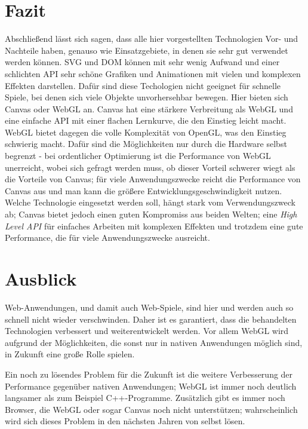 \documentclass[a4paper, 12pt]{article}
\begin{document}
\section{Fazit}
Abschließend lässt sich sagen, dass alle hier vorgestellten Technologien Vor- und Nachteile haben, genauso wie Einsatzgebiete, in denen sie sehr gut verwendet werden können. SVG und DOM können mit sehr wenig Aufwand und einer schlichten API sehr schöne Grafiken und Animationen mit vielen und komplexen Effekten darstellen. Dafür sind diese Techologien nicht geeignet für schnelle Spiele, bei denen sich viele Objekte unvorhersehbar bewegen. Hier bieten sich Canvas oder WebGL an. Canvas hat eine stärkere Verbreitung als WebGL und eine einfache API mit einer flachen Lernkurve, die den Einstieg leicht macht. WebGL bietet dagegen die volle Komplexität von OpenGL, was den Einstieg schwierig macht. Dafür sind die Möglichkeiten nur durch die Hardware selbst begrenzt - bei ordentlicher Optimierung ist die Performance von WebGL unerreicht, wobei sich gefragt werden muss, ob dieser Vorteil schwerer wiegt als die Vorteile von Canvas; für viele Anwendungszwecke reicht die Performance von Canvas aus und man kann die größere Entwicklungsgeschwindigkeit nutzen. Welche Technologie eingesetzt werden soll, hängt stark vom Verwendungszweck ab; Canvas bietet jedoch einen guten Kompromiss aus beiden Welten; eine \emph{High Level API} für einfaches Arbeiten mit komplexen Effekten und trotzdem eine gute Performance, die für viele Anwendungszwecke ausreicht.
\section{Ausblick}
Web-Anwendungen, und damit auch Web-Spiele, sind hier und werden auch so schnell nicht wieder verschwinden. Daher ist es garantiert, dass die behandelten Technologien verbessert und weiterentwickelt werden. Vor allem WebGL wird aufgrund der Möglichkeiten, die sonst nur in nativen Anwendungen möglich sind, in Zukunft eine große Rolle spielen.

Ein noch zu lösendes Problem für die Zukunft ist die weitere Verbesserung der Performance gegenüber nativen Anwendungen; WebGL ist immer noch deutlich langsamer als zum Beispiel C++-Programme. Zusätzlich gibt es immer noch Browser, die WebGL oder sogar Canvas noch nicht unterstützen; wahrscheinlich wird sich dieses Problem in den nächsten Jahren von selbst lösen.
\end{document}
